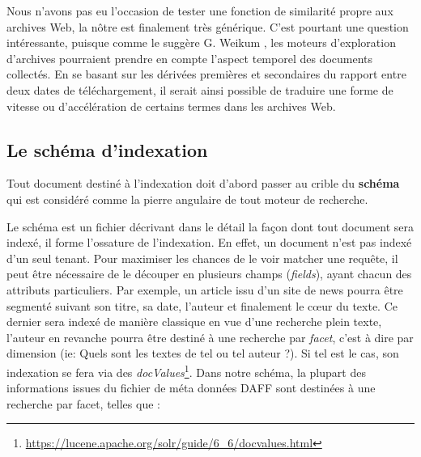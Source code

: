 \documentclass[symmetric,justified,marginals=raggedouter]{tufte-book}
\begin{document}
Nous n'avons pas eu l'occasion de tester une fonction de similarité propre aux archives Web, la nôtre est finalement très générique. C'est pourtant une question  intéressante, puisque comme le suggère G. Weikum \citep{weikum_longitudinal_2011}, les moteurs d'exploration d'archives pourraient prendre en compte l'aspect temporel des documents collectés. En se basant sur les dérivées premières et secondaires du rapport entre deux dates de téléchargement, il serait ainsi possible de traduire une forme de vitesse ou d'accélération de certains termes dans les archives Web.  

\subsection{Le schéma d'indexation}

\noindent Tout document destiné à l'indexation doit d'abord passer au crible du \textbf{schéma} qui est considéré comme la pierre angulaire de tout moteur de recherche. 

Le schéma est un fichier décrivant dans le détail la façon dont tout document sera indexé, il forme l'ossature de l'indexation. En effet, un document n'est pas indexé d'un seul tenant. Pour maximiser les chances de le voir matcher une requête, il peut être nécessaire de le découper en plusieurs champs (\textit{fields}), ayant chacun des attributs particuliers. Par exemple, un article issu d'un site de news pourra être segmenté suivant son titre, sa date, l'auteur et finalement le cœur du texte. Ce dernier sera indexé de manière classique en vue d'une recherche plein texte, l'auteur en revanche pourra être destiné à une recherche par \textit{facet}, c'est à dire par dimension  (ie: Quels sont les textes de tel ou tel auteur ?). Si tel est le cas, son indexation se fera via des \textit{docValues}\footnote{\url{https://lucene.apache.org/solr/guide/6_6/docvalues.html}}. Dans notre schéma, la plupart des informations issues du fichier de méta données DAFF sont destinées à une recherche par facet, telles que :\\
\end{document}
